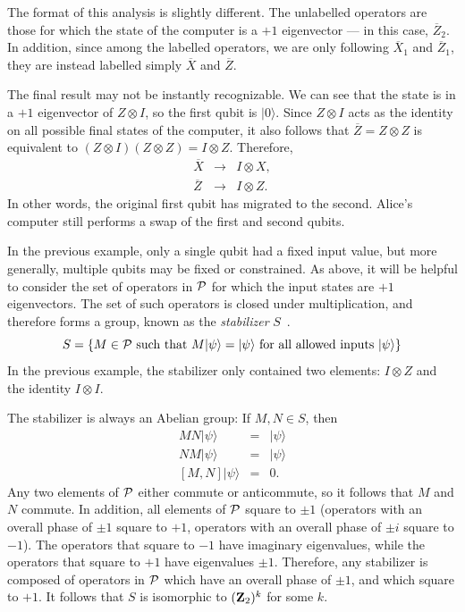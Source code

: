 The format of this analysis is slightly different.  The unlabelled
operators are those for which the state of the computer is a $+1$
eigenvector --- in this case, $\overline{Z}_2$.  In addition, since
among the labelled operators, we are only following $\overline{X}_1$
and $\overline{Z}_1$, they are instead labelled simply $\overline{X}$
and $\overline{Z}$.

The final result may not be instantly recognizable.  We can see that
the state is in a $+1$ eigenvector of $Z \otimes I$, so the first
qubit is $|0\rangle$.  Since $Z \otimes I$ acts as the identity on all
possible final states of the computer, it also follows that
$\overline{Z} = Z \otimes Z$ is equivalent to $\left(Z \otimes I
\right) \left(Z \otimes Z \right) = I \otimes Z$.  Therefore,
\begin{eqnarray}
\overline{X} & \rightarrow & I \otimes X, \\
\overline{Z} & \rightarrow & I \otimes Z.
\end{eqnarray}
In other words, the original first qubit has migrated to the second.
Alice's computer still performs a swap of the first and second qubits.

In the previous example, only a single qubit had a fixed input value,
but more generally, multiple qubits may be fixed or constrained.  As
above, it will be helpful to consider the set of operators in ${\cal
P}$ for which the input states are $+1$ eigenvectors.  The set of such
operators is closed under multiplication, and therefore forms a group,
known as the {\em stabilizer} $S$~\cite{gottesman:stab, CRSS:stab}.  
\begin{equation}
S = \left\{ M \in {\cal P} \mbox{ such that } M |\psi\rangle =
|\psi\rangle \mbox{ for all allowed inputs } |\psi\rangle \right\}
\end{equation}
In the previous example, the stabilizer only contained two elements:
$I \otimes Z$ and the identity $I \otimes I$.

The stabilizer is always an Abelian group: If $M, N \in S$, then
\begin{eqnarray}
M N |\psi\rangle & = & |\psi\rangle \\
N M |\psi\rangle & = & |\psi\rangle \\
{}[M, N] |\psi\rangle & = & 0.
\end{eqnarray}
Any two elements of ${\cal P}$ either commute or anticommute, so it
follows that $M$ and $N$ commute.  In addition, all elements of ${\cal
P}$ square to $\pm 1$ (operators with an overall phase of $\pm 1$
square to $+1$, operators with an overall phase of $\pm i$ square to
$-1$).  The operators that square to $-1$ have imaginary eigenvalues,
while the operators that square to $+1$ have eigenvalues $\pm 1$.
Therefore, any stabilizer is composed of operators in ${\cal P}$ which
have an overall phase of $\pm 1$, and which square to $+1$.  It
follows that $S$ is isomorphic to $({\bf Z}_2)^k$ for some $k$.

